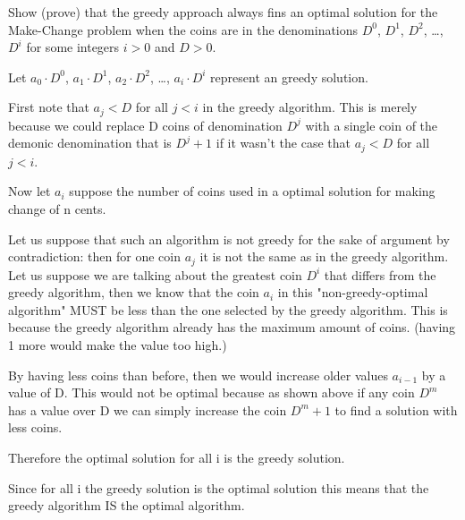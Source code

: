 \documentclass[addpoints,11pt]{exam}
\begin{document}
\begin{questions}



\question [10] Show (prove) that the greedy approach always fins an optimal solution for the Make-Change problem when the coins are in the denominations $D^0$, $D^1$, $D^2$, \dots, $D^i$ for some integers $i>0$ and $D>0$.

\begin{solutionorbox}

   

    Let $a_0 \cdot D^0$, $a_1 \cdot D^1$, $a_2 \cdot D^2$, \dots, $a_i \cdot D^i$ represent an greedy solution.

    First note that $a_j < D$ for all $j < i$ in the greedy algorithm. This is merely because we could replace D coins of denomination $D^j$ with a single coin of the demonic denomination that is $D^j+1$ if it wasn't the case that $a_j < D$ for all $j < i$. 

    Now let $a_i$ suppose the number of coins used in a optimal solution for making change of n cents. 

    Let us suppose that such an algorithm is not greedy for the sake of argument by contradiction: then for one coin $a_j$ it is not the same as in the greedy algorithm. Let us suppose we are talking about the greatest coin $D^i$ that differs from the greedy algorithm, then we know that the coin $a_i$ in this "non-greedy-optimal algorithm" MUST be less than the one selected by the greedy algorithm. This is because the greedy algorithm already has the maximum amount of coins. (having 1 more would make the value too high.)

    By having less coins than before, then we would increase older values $a_{i-1}$ by a value of D. This would not be optimal because as shown above if any coin $D^m$ has a value over D we can simply increase the coin $D^m+1$ to find a solution with less coins. 

    Therefore the optimal solution for all i is the greedy solution.

   Since for all i the greedy solution is the optimal solution this means that the greedy algorithm IS the optimal algorithm. 
    
\end{solutionorbox}

\ifprintanswers
\newpage
\else
\bigskip
\fi



\end{questions}
\end{document}

